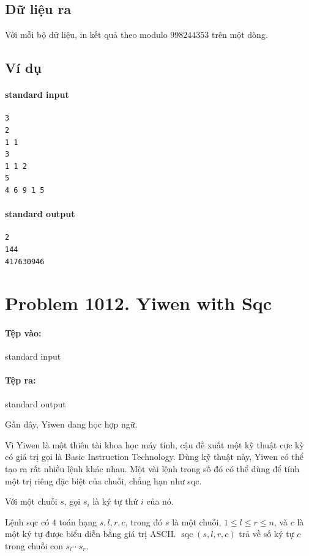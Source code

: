 \documentclass[11pt]{article}
\begin{document}
\subsection*{Dữ liệu ra}

Với mỗi bộ dữ liệu, in kết quả theo modulo \(998244353\) trên một dòng.

\subsection*{Ví dụ}

\paragraph{standard input}
\begin{verbatim}
3
2
1 1
3
1 1 2
5
4 6 9 1 5
\end{verbatim}

\paragraph{standard output}
\begin{verbatim}
2
144
417630946
\end{verbatim}

\section{Problem 1012. Yiwen with Sqc}

\paragraph{Tệp vào:} standard input
\paragraph{Tệp ra:} standard output

Gần đây, Yiwen đang học hợp ngữ.

Vì Yiwen là một thiên tài khoa học máy tính, cậu đề xuất một kỹ thuật cực kỳ
có giá trị gọi là Basic Instruction Technology. Dùng kỹ thuật này, Yiwen có
thể tạo ra rất nhiều lệnh khác nhau. Một vài lệnh trong số đó có thể dùng để
tính một trị riêng đặc biệt của chuỗi, chẳng hạn như sqc.

Với một chuỗi \(s\), gọi \(s_i\) là ký tự thứ \(i\) của nó.

Lệnh sqc có \(4\) toán hạng \(s,l,r,c\), trong đó \(s\) là một chuỗi,
\(1\le l\le r\le n\), và \(c\) là một ký tự được biểu diễn bằng giá trị ASCII.
\(\operatorname{sqc}(s,l,r,c)\) trả về số ký tự \(c\) trong chuỗi con
\(s_l\cdots s_r\).
\end{document}
